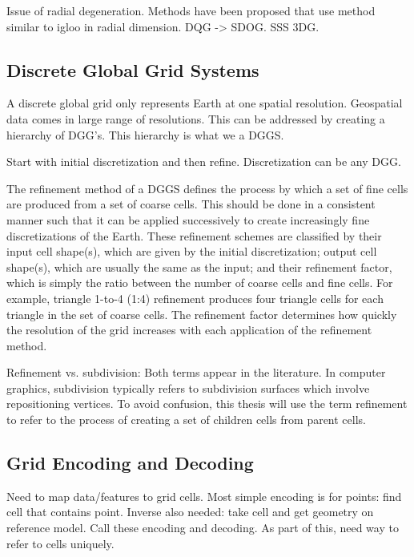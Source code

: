 Issue of radial degeneration.
Methods have been proposed that use method similar to igloo in radial dimension.
DQG -> SDOG.
SSS 3DG.


\subsection{Discrete Global Grid Systems}
A discrete global grid only represents Earth at one spatial resolution.
Geospatial data comes in large range of resolutions.
This can be addressed by creating a hierarchy of DGG's.
This hierarchy is what we a DGGS.


Start with initial discretization and then refine.
Discretization can be any DGG.


The refinement method of a DGGS defines the process by which a set of fine cells are produced from a set of coarse cells.
This should be done in a consistent manner such that it can be applied successively to create increasingly fine discretizations of the Earth.
These refinement schemes are classified by their input cell shape(s), which are given by the initial discretization; output cell shape(s), which are usually the same as the input; and their refinement factor, which is simply the ratio between the number of coarse cells and fine cells.
For example, triangle 1-to-4 (1:4) refinement produces four triangle cells for each triangle in the set of coarse cells.
The refinement factor determines how quickly the resolution of the grid increases with each application of the refinement method.


Refinement vs. subdivision: Both terms appear in the literature.
In computer graphics, subdivision typically refers to subdivision surfaces which involve repositioning vertices.
To avoid confusion, this thesis will use the term refinement to refer to the process of creating a set of children cells from parent cells. 


\subsection{Grid Encoding and Decoding}
Need to map data/features to grid cells.
Most simple encoding is for points: find cell that contains point.
Inverse also needed: take cell and get geometry on reference model.
Call these encoding and decoding.
As part of this, need way to refer to cells uniquely.



